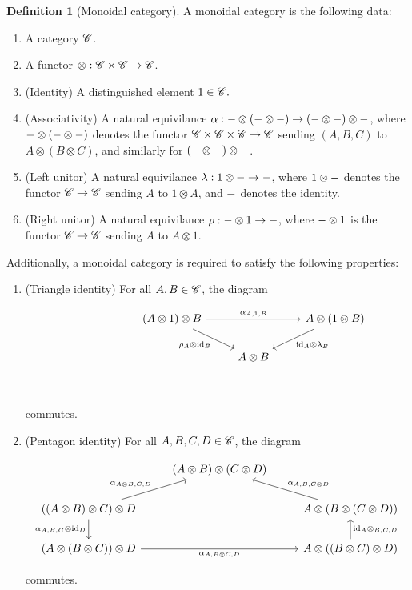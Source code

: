 \documentclass{article}
\theoremstyle{definition}
\newtheorem*{definition}{Definition}
\numberwithin{figure}{section}
\begin{document}
\begin{definition}[Monoidal category] A monoidal category is the following data:

\begin{enumerate}
\item A category $\mathscr{C}$.
\item A functor $\otimes: \mathscr{C} \times \mathscr{C} \to \mathscr{C}$.
\item (Identity) A distinguished element $1\in \mathscr{C}.$
\item (Associativity) A natural equivilance $\alpha: \--\otimes (\-- \otimes \--) \to (\--\otimes \--)\otimes \--$, where $\-- \otimes (\--\otimes \--)$ denotes the functor $\mathscr{C}\times \mathscr{C}\times \mathscr{C}\to\mathscr{C}$ sending $(A,B,C)$ to $A\otimes (B\otimes C)$, and similarly for $(\-- \otimes \-- )\otimes\--$.
\item (Left unitor) A  natural equivilance $\lambda: 1\otimes \-- \to \--$, where $1\otimes \--$ denotes the functor $\mathscr{C}\to \mathscr{C}$ sending $A$ to $1\otimes A$, and $\--$ denotes the identity.
\item (Right unitor) A natural equivilance $\rho: \--\otimes 1 \to \--$, where $\--\otimes 1$ is the functor $\mathscr{C}\to \mathscr{C}$ sending $A$ to $A\otimes 1$.
\end{enumerate}

Additionally, a monoidal category is required to satisfy the following properties:

\begin{enumerate}
\item (Triangle identity) For all $A,B\in \mathscr{C}$, the diagram

\[\begin{tikzcd}
	{} & {} & {\left(A\otimes 1\right)\otimes B} & {} & {A\otimes (1\otimes B)} \\
	&& {} & {A\otimes B} \\
	&&&& {}
	\arrow["{\alpha_{A,1,B}}", from=1-3, to=1-5]
	\arrow["{\rho_A\otimes \id_B}"', from=1-3, to=2-4]
	\arrow["{\id_A\otimes \lambda_B}", from=1-5, to=2-4]
\end{tikzcd}\]

commutes.

\item (Pentagon identity) For all $A,B,C,D\in \mathscr{C}$, the diagram

\[\begin{tikzcd}
	& {(A\otimes B)\otimes(C\otimes D)} \\
	{((A\otimes B)\otimes C)\otimes D} && {A\otimes (B\otimes (C\otimes D))} \\
	{(A\otimes (B\otimes C))\otimes D} && {A\otimes((B\otimes C)\otimes D)}
	\arrow["{\alpha_{A\otimes B, C,D}}", from=2-1, to=1-2]
	\arrow["{\alpha_{A,B,{C\otimes D}}}"', from=2-3, to=1-2]
	\arrow["{\alpha_{A,B,C}\otimes \id_D}"', from=2-1, to=3-1]
	\arrow["{\id_A\otimes_{B,C,D}}"', from=3-3, to=2-3]
	\arrow["{\alpha_{A,B\otimes C,D}}"', from=3-1, to=3-3]
\end{tikzcd}\]

commutes.
\end{enumerate}

\raggedleft\qedsymbol{}
\end{definition}
\end{document}
